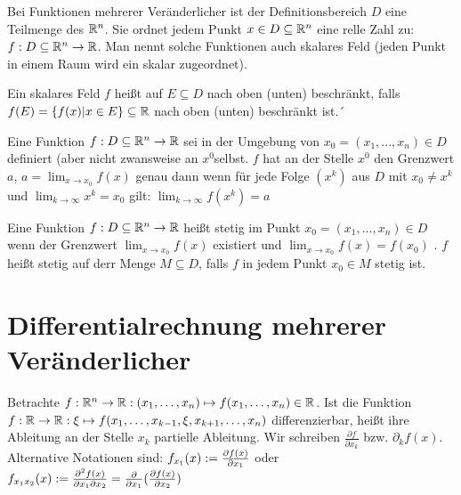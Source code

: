 \begin{definition}
	Bei Funktionen mehrerer Veränderlicher ist der Definitionsbereich $D$ eine Teilmenge des $\mathbb{R}^n$. Sie ordnet 
	jedem Punkt $x \in D \subseteq \mathbb{R}^n$ eine relle Zahl zu: $f : D \subseteq \mathbb{R}^n \rightarrow \mathbb{R}$. Man nennt solche Funktionen auch skalares Feld (jeden Punkt in einem Raum wird ein skalar zugeordnet). 
	
	Ein skalares Feld $f$ heißt auf $E \subseteq D$ nach oben (unten) beschränkt, falls $f(E) = \{f(x) | x \in E\} \subseteq \mathbb{R}$  nach oben (unten) beschränkt ist.´ 
\end{definition}

\begin{definition}
	Eine Funktion $f : D \subseteq \mathbb{R}^n \rightarrow \mathbb{R}$ sei in der Umgebung von $x_0 = (x_1, ..., x_n) \in D$ definiert (aber nicht zwansweise an $x^0 $selbst. $f$ hat an der Stelle  $x^0$ den Grenzwert $a$, $a = \lim_{x \rightarrow x_0} f(x)$ genau dann wenn für jede Folge $(x^k)$ aus $D$ mit $x_0 \neq x^k$ und $\lim_{k \rightarrow \infty} x^k = x_0$ gilt: $\lim_{k \rightarrow \infty} f(x^k) = a$
\end{definition}

\begin{definition}[Stetigkeit]
		Eine Funktion $f : D \subseteq \mathbb{R}^n \rightarrow \mathbb{R}$  heißt stetig im Punkt $x_0 = (x_1, ..., x_n) \in D$ wenn der Grenzwert $\lim_{x \rightarrow x_0} f(x)$ existiert und $\lim_{x \rightarrow x_0} f(x) = f(x_0)$ . $f$ heißt stetig auf derr Menge $M \subseteq D$, falls $f$ in jedem Punkt $x_0 \in M$ stetig ist.
\end{definition}

\pagebreak

\section{Differentialrechnung mehrerer Veränderlicher}

\begin{definition}
	Betrachte $f : \mathbb{R}^n \rightarrow \mathbb{R} : (x_1, \dots, x_n) \mapsto f(x_1, \dots, x_n) \in \mathbb{R}$. Ist die Funktion $f : \mathbb{R} \rightarrow \mathbb{R} : \xi \mapsto f(x_1, \dots, x_{k-1}, \xi, x_{k+1}, \dots, x_n)$ differenzierbar, heißt ihre Ableitung an der Stelle $x_k$ partielle Ableitung. Wir schreiben $\frac{\partial f}{\partial x_k}$ bzw. $\partial_k f(x)$. Alternative Notationen sind: $f_{x_1}(x) := \frac{\partial f(x)}{\partial x_1}$ oder $f_{x_1x_2}(x) := \frac{\partial ^2 f(x)}{\partial x_1 \partial x_2} = \frac{\partial}{\partial x_1}(\frac{\partial f(x)}{\partial x_2})$
\end{definition}

